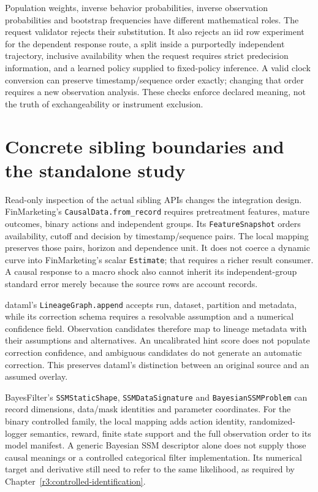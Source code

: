 Population weights, inverse behavior probabilities, inverse observation
probabilities and bootstrap frequencies have different mathematical roles.
The request validator rejects their substitution. It also rejects an iid
row experiment for the dependent response route, a split inside a purportedly
independent trajectory, inclusive availability when the request requires
strict predecision information, and a learned policy supplied to fixed-policy
inference. A valid clock conversion can preserve timestamp/sequence order
exactly; changing that order requires a new observation analysis. These
checks enforce declared meaning, not the truth of exchangeability or
instrument exclusion.

\section{Concrete sibling boundaries and the standalone study}
\label{s4:sibling-mappings}
Read-only inspection of the actual sibling APIs changes the integration
design. FinMarketing's \texttt{CausalData.from\_record} requires pretreatment
features, mature outcomes, binary actions and independent groups. Its
\texttt{FeatureSnapshot} orders availability, cutoff and decision by
timestamp/sequence pairs. The local mapping preserves those pairs, horizon
and dependence unit. It does not coerce a dynamic curve into FinMarketing's
scalar \texttt{Estimate}; that requires a richer result consumer. A causal
response to a macro shock also cannot inherit its independent-group standard
error merely because the source rows are account records.

dataml's \texttt{LineageGraph.append} accepts run, dataset, partition and
metadata, while its correction schema requires a resolvable assumption and
a numerical confidence field. Observation candidates therefore map to
lineage metadata with their assumptions and alternatives. An uncalibrated
hint score does not populate correction confidence, and ambiguous candidates
do not generate an automatic correction. This preserves dataml's distinction
between an original source and an assumed overlay.

BayesFilter's \texttt{SSMStaticShape}, \texttt{SSMDataSignature} and
\texttt{BayesianSSMProblem} can record dimensions, data/mask identities and
parameter coordinates. For the binary controlled family, the local mapping
adds action identity, randomized-logger semantics, reward, finite state
support and the full observation order to its model manifest. A generic
Bayesian SSM descriptor alone does not supply those causal meanings or a
controlled categorical filter implementation. Its numerical target and
derivative still need to refer to the same likelihood, as required by
Chapter~\ref{r3:controlled-identification}.

